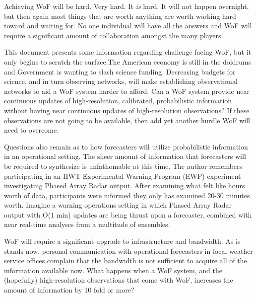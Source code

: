 

Achieving WoF will be hard. Very hard. It \emph{is} hard. It will not happen overnight, but then again most things that are worth anything are worth working hard toward and waiting for.  No one individual will have all the answers and WoF will require a significant amount of collaboration amongst the many players.


This document presents some information regarding challenge facing WoF, but it only begins to scratch the surface.The American economy is still in the doldrums and Government is wanting to slash science funding.  Decreasing budgets for science, and in turn observing networks, will make establishing observational networks to aid a WoF system harder to afford.  Can a WoF system provide near continuous updates of high-resolution, calibrated, probabilistic information without having near continuous updates of high-resolution observations? If these observations are not going to be available, then add yet another hurdle WoF will need to overcome.


Questions also remain as to how forecasters will utilize probabilistic information in an operational setting.  The sheer amount of information that forecasters will be required to synthesize is unfathomable at this time.  The author remembers participating in an HWT-Experimental Warning Program (EWP) experiment investigating Phased Array Radar output. After examining what felt like hours worth of data, participants were informed they only has examined 20-30 minutes worth. Imagine a warning operations setting in which Phased Array Radar output with O(1 min) updates are being thrust upon a forecaster, combined with near real-time analyses from a multitude of ensembles.


WoF will require a significant upgrade to infrastructure and bandwidth. As is stands now, personal communication with operational forecasters in local weather service offices complain that the bandwidth is not sufficient to acquire all of the information available now.  What happens when a WoF system, and the (hopefully) high-resolution observations that come with WoF, increases the amount of information by 10 fold or more?


